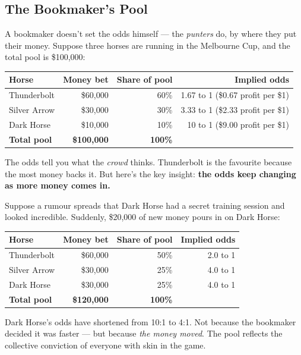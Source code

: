 \documentclass[11pt,a4paper]{article}
\begin{document}
\subsection{The Bookmaker's Pool}

A bookmaker doesn't set the odds himself --- the \emph{punters} do,
by where they put their money. Suppose three horses are running in
the Melbourne Cup, and the total pool is \$100,000:

\vspace{0.5em}
\begin{tabular}{@{}lrrr@{}}
    \toprule
    \textbf{Horse} & \textbf{Money bet} & \textbf{Share of pool}
        & \textbf{Implied odds} \\
    \midrule
    Thunderbolt  & \$60,000 & 60\% & 1.67 to 1 (\$0.67 profit per \$1) \\
    Silver Arrow & \$30,000 & 30\% & 3.33 to 1 (\$2.33 profit per \$1) \\
    Dark Horse   & \$10,000 & 10\% & 10 to 1 (\$9.00 profit per \$1) \\
    \midrule
    \textbf{Total pool} & \textbf{\$100,000} & \textbf{100\%} & \\
    \bottomrule
\end{tabular}

\vspace{0.5em}
The odds tell you what the \emph{crowd} thinks. Thunderbolt is the
favourite because the most money backs it. But here's the key insight:
\textbf{the odds keep changing as more money comes in.}

Suppose a rumour spreads that Dark Horse had a secret training session
and looked incredible. Suddenly, \$20,000 of new money pours in on
Dark Horse:

\vspace{0.5em}
\begin{tabular}{@{}lrrr@{}}
    \toprule
    \textbf{Horse} & \textbf{Money bet} & \textbf{Share of pool}
        & \textbf{Implied odds} \\
    \midrule
    Thunderbolt  & \$60,000 & 50\% & 2.0 to 1 \\
    Silver Arrow & \$30,000 & 25\% & 4.0 to 1 \\
    Dark Horse   & \$30,000 & 25\% & 4.0 to 1 \\
    \midrule
    \textbf{Total pool} & \textbf{\$120,000} & \textbf{100\%} & \\
    \bottomrule
\end{tabular}

\vspace{0.5em}
Dark Horse's odds have shortened from 10:1 to 4:1. Not because the
bookmaker decided it was faster --- but because \emph{the money moved}.
The pool reflects the collective conviction of everyone with skin in
the game.
\end{document}
